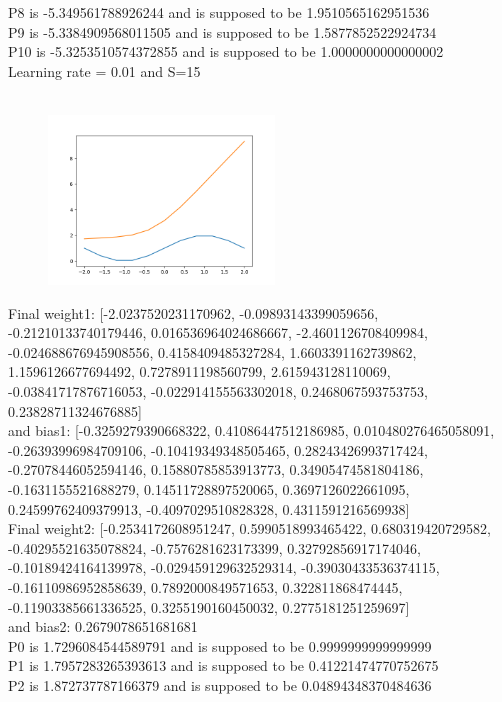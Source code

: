 \documentclass{article}
\begin{document}
P8 is -5.349561788926244 and is supposed to be 1.9510565162951536\\
P9 is -5.3384909568011505 and is supposed to be 1.5877852522924734\\
P10 is -5.3253510574372855 and is supposed to be 1.0000000000000002\\
Learning rate = 0.01 and S=15\\~\\
\begin{figure}[htp]
    \centering
    \includegraphics[width=6cm]{photos/2_01.png}
    \label{fig:2}
\end{figure}
Final weight1: [-2.0237520231170962, -0.09893143399059656, -0.21210133740179446, 0.016536964024686667, -2.4601126708409984, -0.024688676945908556, 0.4158409485327284, 1.6603391162739862, 1.1596126677694492, 0.7278911198560799, 2.615943128110069, -0.03841717876716053, -0.022914155563302018, 0.2468067593753753, 0.23828711324676885]\\ and bias1: [-0.3259279390668322, 0.41086447512186985, 0.010480276465058091, -0.26393996984709106, -0.10419349348505465, 0.28243426993717424, -0.27078446052594146, 0.15880785853913773, 0.34905474581804186, -0.1631155521688279, 0.14511728897520065, 0.3697126022661095, 0.24599762409379913, -0.4097029510828328, 0.4311591216569938]\\
Final weight2: [-0.2534172608951247, 0.5990518993465422, 0.680319420729582, -0.40295521635078824, -0.7576281623173399, 0.32792856917174046, -0.10189424164139978, -0.029459129632529314, -0.39030433536374115, -0.16110986952858639, 0.7892000849571653, 0.322811868474445, -0.11903385661336525, 0.3255190160450032, 0.2775181251259697]\\ and bias2: 0.2679078651681681\\
P0 is 1.7296084544589791 and is supposed to be 0.9999999999999999\\
P1 is 1.7957283265393613 and is supposed to be 0.41221474770752675\\
P2 is 1.872737787166379 and is supposed to be 0.04894348370484636\\
\end{document}
